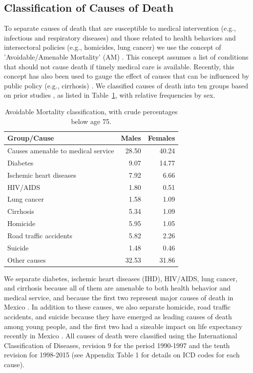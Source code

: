 \documentclass{article}
\begin{document}
\begin{spacing}{1.5}
\subsection*{Classification of Causes of Death}
To separate causes of death that are susceptible to medical intervention (e.g.,
infectious and respiratory diseases) and those related to health behaviors and
intersectoral policies (e.g., homicides, lung cancer) we use the concept of
'Avoidable/Amenable Mortality' (AM) \citep{nolte&mckee2004, nolte&mckee2008}. This
concept assumes a list of conditions that should not cause death if timely
medical care is available. Recently, this concept has also been used to gauge
the effect of causes that can be influenced by public policy (e.g., cirrhosis) \citep{elo2014}. We classified causes of death into ten groups based on prior studies \citep{elo2014, Aburto2015}, as listed in Table~\ref{tab:causes}, with
relative frequencies by sex.

\begin{table}[ht]
\centering
\caption{Avoidable Mortality classification, with crude percentages below age 75.}
\label{tab:causes}
\begin{tabular}{>{\raggedright}m{3cm}rr}
Group/Cause  & Males & Females \\ 
  \hline
Causes amenable to medical service & 28.50 & 40.24 \\ 
  Diabetes & 9.07 & 14.77 \\ 
  Ischemic heart diseases & 7.92 & 6.66 \\ 
  HIV/AIDS & 1.80 & 0.51 \\ 
  Lung cancer & 1.58 & 1.09 \\ 
  Cirrhosis & 5.34 & 1.09 \\ 
  Homicide & 5.95 & 1.05 \\ 
  Road traffic accidents & 5.82 & 2.26 \\ 
  Suicide & 1.48 & 0.46 \\ 
  Other causes & 32.53 & 31.86 \\ 
   \hline
\end{tabular}
\end{table}

We separate diabetes, ischemic heart diseases (IHD), HIV/AIDS, lung
cancer, and cirrhosis because all of them are amenable to both health behavior
and medical service, and because the first two represent major causes of death
in Mexico \citep{canudas2014}. In addition to these causes, we also separate
homicide, road traffic accidents, and suicide because they have emerged as
leading causes of death among young people, and the first two had a sizeable
impact on life expectancy recently in Mexico \citep{canudas2014}. All causes of
death were classified using the International Classification of Diseases,
revision 9 for the period 1990-1997 and the tenth revision for 1998-2015 (see
Appendix Table 1 for details on ICD codes for each cause). %


\end{spacing}
\end{document}
